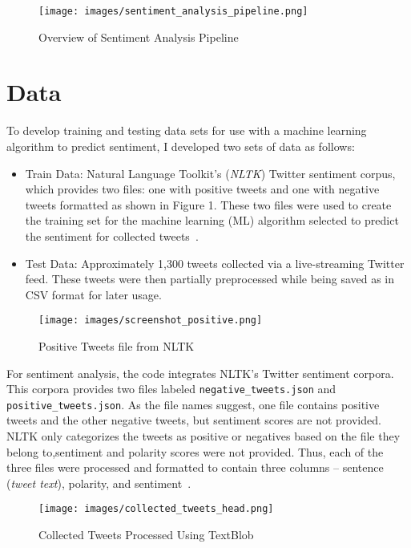 \begin{figure}[H]
\centering
\texttt{[image: images/sentiment\_analysis\_pipeline.png]}
\caption{Overview of Sentiment Analysis Pipeline}
\label{fig:pipeline}
\end{figure}

\section{Data} 

To develop training and testing data sets for use
with a machine learning algorithm to predict
sentiment, I developed two sets of data as follows:

\begin{itemize}
\item Train Data:  Natural Language Toolkit's
(\emph{NLTK}) Twitter sentiment corpus, which
provides two files:  one with positive tweets and one
with negative tweets formatted as shown in Figure 1.
These two files were used to create the training set
for the machine learning (ML) algorithm selected to
predict the sentiment for collected tweets~\cite{twitter14}.

\item Test Data:  Approximately 1,300 tweets collected via a
live-streaming Twitter feed.  These tweets were then partially
preprocessed while being saved as in CSV format for later usage.
\end{itemize}

\begin{figure}[H]
\centering
\texttt{[image: images/screenshot\_positive.png]}
\caption{Positive Tweets file from NLTK}
\label{fig:positive}
\end{figure} 

For sentiment analysis, the code integrates NLTK's Twitter sentiment corpora.  
This corpora provides two files labeled
\verb|negative_tweets.json| and \verb|positive_tweets.json|.  As
the file names suggest, one file contains positive tweets and
the other negative tweets, but sentiment scores are not provided.
NLTK only categorizes the tweets as
positive or negatives based on the file they belong to,sentiment
and polarity scores were not
provided.  Thus, each of the three files were processed and
formatted to contain three columns --
sentence (\emph{tweet text}), polarity, and sentiment~\cite{twitter_analysis}. 

\begin{figure}[H]
\centering
\texttt{[image: images/collected\_tweets\_head.png]}
\caption{Collected Tweets Processed Using TextBlob}
\label{fig:textblob_tweets}
\end{figure} 

